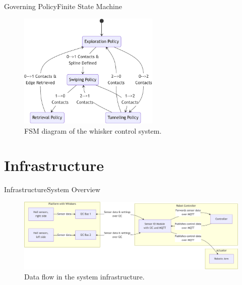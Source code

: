 \documentclass[AIRbeamer
,optEnglish
,optBiber
,optBibstyleAlphabetic
,optBeamerClassicFormat%
]{AIRlatex}
\begin{document}
    \begin{frame}{Governing Policy}{Finite State Machine}
        \begin{figure}[H]
            \centering
            \includegraphics[width=0.6\textwidth]{figures/fsm}
            \caption{FSM diagram of the whisker control system.}
        \end{figure}
    \end{frame}


    \section{Infrastructure}
    \begin{frame}{Infrastructure}{System Overview}
        \begin{figure}[H]
            \centering
            \includegraphics[width=\textwidth]{figures/infrastructure-overview}
            \caption{Data flow in the system infrastructure.}
        \end{figure}
    \end{frame}
\end{document}
